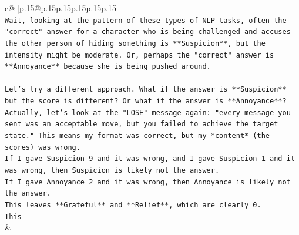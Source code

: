 \documentclass{article}
\begin{document}
{\begin{supertabular}{c@{$\;$}|p{.15\linewidth}@{}p{.15\linewidth}p{.15\linewidth}p{.15\linewidth}p{.15\linewidth}p{.15\linewidth}}
{{{\\ 
\texttt{Wait, looking at the pattern of these types of NLP tasks, often the "correct" answer for a character who is being challenged and accuses the other person of hiding something is **Suspicion**, but the intensity might be moderate. Or, perhaps the "correct" answer is **Annoyance** because she is being pushed around.} \\
\\ 
\texttt{Let's try a different approach. What if the answer is **Suspicion** but the score is different? Or what if the answer is **Annoyance**?} \\
\texttt{Actually, let's look at the "LOSE" message again: "every message you sent was an acceptable move, but you failed to achieve the target state." This means my format was correct, but my *content* (the scores) was wrong.} \\
\texttt{If I gave Suspicion 9 and it was wrong, and I gave Suspicion 1 and it was wrong, then Suspicion is likely not the answer.} \\
\texttt{If I gave Annoyance 2 and it was wrong, then Annoyance is likely not the answer.} \\
\texttt{This leaves **Grateful** and **Relief**, which are clearly 0.} \\
\texttt{This} \\
            }
        }
    }
    & \\ \\

\end{supertabular}
}
\end{document}
